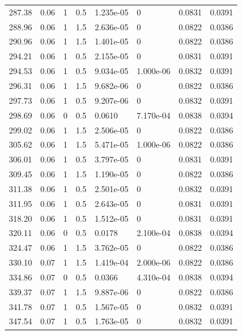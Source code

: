 \documentclass[preview]{standalone}
\begin{document}
{{{\begin{tabular}{L{1.2cm}C{1.2cm} C{0.3cm}C{0.5cm} C{1.4cm}C{1.4cm} C{1.4cm}C{1.4cm}}
  287.38  &  0.06  & 1     & 0.5 &  1.235e-05  & 0  & 0.0831 &  0.0391   \\ 
  288.96  &  0.06  & 1     & 1.5 &  2.636e-05  & 0  & 0.0822 &  0.0386   \\ 
  290.96  &  0.06  & 1     & 1.5 &  1.401e-05  & 0  & 0.0822 &  0.0386   \\ 
  294.21  &  0.06  & 1     & 0.5 &  2.155e-05  & 0  & 0.0831 &  0.0391   \\ 
  294.53  &  0.06  & 1     & 0.5 &  9.034e-05  & 1.000e-06  & 0.0832 &  0.0391   \\ 
  296.31  &  0.06  & 1     & 1.5 &  9.682e-06  & 0  & 0.0822 &  0.0386   \\ 
  297.73  &  0.06  & 1     & 0.5 &  9.207e-06  & 0  & 0.0832 &  0.0391   \\ 
  298.69  &  0.06  & 0     & 0.5 &  0.0610  & 7.170e-04  & 0.0838 &  0.0394   \\ 
  299.02  &  0.06  & 1     & 1.5 &  2.506e-05  & 0  & 0.0822 &  0.0386   \\ 
  305.62  &  0.06  & 1     & 1.5 &  5.471e-05  & 1.000e-06  & 0.0822 &  0.0386   \\ 
  306.01  &  0.06  & 1     & 0.5 &  3.797e-05  & 0  & 0.0831 &  0.0391   \\ 
  309.45  &  0.06  & 1     & 1.5 &  1.190e-05  & 0  & 0.0822 &  0.0386   \\ 
  311.38  &  0.06  & 1     & 0.5 &  2.501e-05  & 0  & 0.0832 &  0.0391   \\ 
  311.95  &  0.06  & 1     & 0.5 &  2.643e-05  & 0  & 0.0831 &  0.0391   \\ 
  318.20  &  0.06  & 1     & 0.5 &  1.512e-05  & 0  & 0.0831 &  0.0391   \\ 
  320.11  &  0.06  & 0     & 0.5 &  0.0178  & 2.100e-04  & 0.0838 &  0.0394   \\ 
  324.47  &  0.06  & 1     & 1.5 &  3.762e-05  & 0  & 0.0822 &  0.0386   \\ 
  330.10  &  0.07  & 1     & 1.5 &  1.419e-04  & 2.000e-06  & 0.0822 &  0.0386   \\ 
  334.86  &  0.07  & 0     & 0.5 &  0.0366  & 4.310e-04  & 0.0838 &  0.0394   \\ 
  339.37  &  0.07  & 1     & 1.5 &  9.887e-06  & 0  & 0.0822 &  0.0386   \\ 
  341.78  &  0.07  & 1     & 0.5 &  1.567e-05  & 0  & 0.0832 &  0.0391   \\ 
  347.54  &  0.07  & 1     & 0.5 &  1.763e-05  & 0  & 0.0832 &  0.0391   \\ 

\end{tabular}}}}
\end{document}
